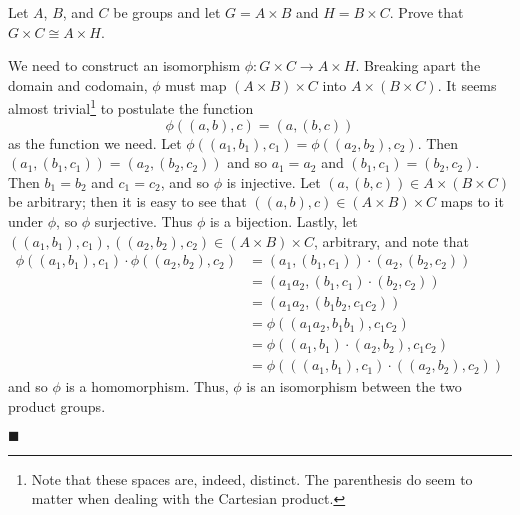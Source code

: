 \documentclass[12pt]{article}
\renewcommand{\qed}{\hfill$\blacksquare$}
\renewenvironment{proof}{\begin{addmargin}[1em]{0em}\begin{newproof}}{\end{newproof}\end{addmargin}\qed}
\newenvironment{problem}[2][Exercise]{\begin{trivlist}
\item[\hskip \labelsep {\bfseries #1}\hskip \labelsep {\bfseries #2.}]}{\end{trivlist}}
\begin{document}
\begin{problem}{1.6.12}
Let $A$, $B$, and $C$ be groups and let $G=A\times B$ and $H = B\times C$. Prove that $G\times C \cong A \times H$.
\end{problem}
\begin{proof}
We need to construct an isomorphism $\phi:G\times C \rightarrow A\times H$. Breaking apart the domain and codomain, $\phi$ must map $\left(A\times B\right)\times C$ into $A\times\left(B\times C\right)$. It seems almost trivial\footnote{Note that these spaces are, indeed, distinct. The parenthesis do seem to matter when dealing with the Cartesian product.} to postulate the function
$$ \phi\left(\left(a,b\right),c\right) = \left(a,\left(b,c\right)\right) $$ as the function we need.
Let $\phi\left(\left(a_1,b_1\right),c_1\right)=\phi\left(\left(a_2,b_2\right),c_2\right)$. Then $\left(a_1,\left(b_1,c_1\right)\right)=\left(a_2,\left(b_2,c_2\right)\right)$ and so $a_1=a_2$ and $\left(b_1,c_1\right)=\left(b_2,c_2\right)$. Then $b_1=b_2$ and $c_1=c_2$, and so $\phi$ is injective. Let $\left(a,\left(b,c\right)\right)\in A\times \left(B\times C\right)$ be arbitrary; then it is easy to see that $\left(\left(a,b\right),c\right)\in \left(A\times B\right)\times C$ maps to it under $\phi$, so $\phi$ surjective. Thus $\phi$ is a bijection. Lastly, let $\left(\left(a_1,b_1\right),c_1\right), \left(\left(a_2,b_2\right),c_2\right)\in \left(A\times B\right)\times C$, arbitrary, and note that
\begin{equation*}
    \begin{split}
        \phi\left(\left(a_1,b_1\right),c_1\right) \cdot \phi\left(\left(a_2,b_2\right),c_2\right) & = \left(a_1,\left(b_1,c_1\right)\right)\cdot \left(a_2,\left(b_2,c_2\right)\right) \\
        & = \left(a_1a_2, \left(b_1,c_1\right)\cdot \left(b_2,c_2\right)\right) \\
        & = \left(a_1a_2, \left(b_1b_2,c_1c_2\right)\right) \\
        & = \phi\left(\left(a_1a_2,b_1b_1\right),c_1c_2\right) \\
        & = \phi \left(\left(a_1,b_1\right)\cdot \left(a_2,b_2\right),c_1c_2\right) \\
        & = \phi\left(\left( \left(a_1,b_1\right),c_1\right)\cdot \left(\left(a_2,b_2\right),c_2\right)\right)
    \end{split}
\end{equation*}
and so $\phi$ is a homomorphism. Thus, $\phi$ is an isomorphism between the two product groups.
\end{proof}
\end{document}
